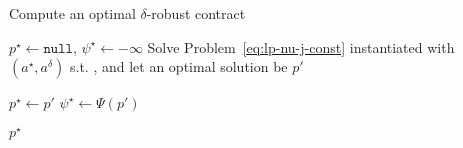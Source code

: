 \begin{algorithm}[!htp]
	\caption{Compute an optimal $\delta$-robust contract}
	\label{alg:robust_poly}
	\begin{algorithmic}[1]
		\State $p^\star \leftarrow \texttt{null}$,\; 
		$\psi^\star \leftarrow -\infty$
		 \label{ln:inner-for}
		\State 
		Solve Problem~\eqref{eq:lp-nu-j-const} instantiated with $(a^\star,a^\delta)$ s.t. ,
		and let an optimal solution be $p'$
		
		\State $p^\star \leftarrow p'$ 
		\State $\psi^\star \leftarrow \Psi(p')$
		\EndIf
		
		\label{ln:inner-for-end}
		\EndFor
		\EndFor
		 $p^\star$
	\end{algorithmic}
\end{algorithm}
%

